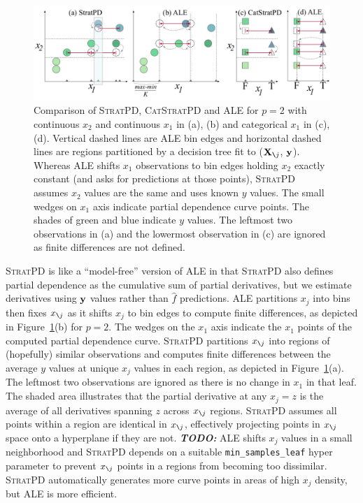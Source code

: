 \documentclass[smallextended]{svjour3}       %
\newcommand{\figref}[1]{Figure~\ref{#1}}
\newcommand{\todo}[1]{{\bf\em TODO:} {{\color{red}{#1}}}}
\newcommand{\spd}{\fontfamily{cmr}\textsc{\small StratPD}}
\newcommand{\cspd}{\fontfamily{cmr}\textsc{\small CatStratPD}}
\newcommand{\Xnj}{${\bf X}_{\texttt{\char`\\} j}$}
\newcommand{\xnj}{$x_{\texttt{\char`\\} j}$}
\begin{document}
\begin{figure}[!htbp]
\begin{center}
\includegraphics[scale=.4]{images/partitioning.pdf}\vspace{-3mm}
\caption{\small Comparison of \spd, \cspd{} and ALE for $p=2$ with continuous $x_2$ and continuous $x_1$ in (a), (b) and  categorical $x_1$ in (c), (d).  Vertical dashed lines are ALE bin edges and horizontal dashed lines are regions partitioned by a decision tree fit to (\Xnj, ${\bf y}$). Whereas ALE shifts $x_1$ observations to bin edges holding $x_2$ exactly constant (and asks for predictions at those points), \spd{} assumes $x_2$ values are the same and uses known $y$ values. The small wedges on $x_1$ axis indicate partial dependence curve points.  The shades of green and blue indicate $y$ values. The leftmost two observations in (a) and the lowermost observation in (c) are ignored as finite differences are not defined.}
\label{fig:partitioning}
\end{center}
\end{figure}

\spd{} is like a ``model-free'' version of ALE in that \spd{} also defines partial dependence as the cumulative sum of partial derivatives, but we estimate derivatives using $\bf y$ values rather than $\hat{f}$ predictions. 
ALE partitions $x_j$ into bins then fixes \xnj{} as it shifts $x_j$ to bin edges to compute finite differences, as depicted in \figref{fig:partitioning}(b) for $p=2$. The wedges on the $x_1$ axis indicate the $x_1$ points of the computed partial dependence curve.  \spd{} partitions \xnj{} into regions of (hopefully) similar observations and computes finite differences between the average $y$ values at unique $x_j$ values in each region, as depicted in \figref{fig:partitioning}(a).  The leftmost two observations are ignored as there is no change in $x_1$ in that leaf. The shaded area illustrates that the partial derivative at any $x_j=z$ is the average of all derivatives spanning $z$ across \xnj{} regions.  \spd{} assumes all points within a region are identical in \xnj{}, effectively projecting points in \xnj{} space onto a hyperplane if they are not. \todo{is projection right term?}  ALE shifts $x_j$ values in a small neighborhood and \spd{} depends on a suitable {\tt\small min\_samples\_leaf}  hyper parameter to prevent \xnj{} points in a regions from becoming too dissimilar.  \spd{} automatically generates more curve points in areas of high $x_j$ density, but ALE is more efficient.
\end{document}
